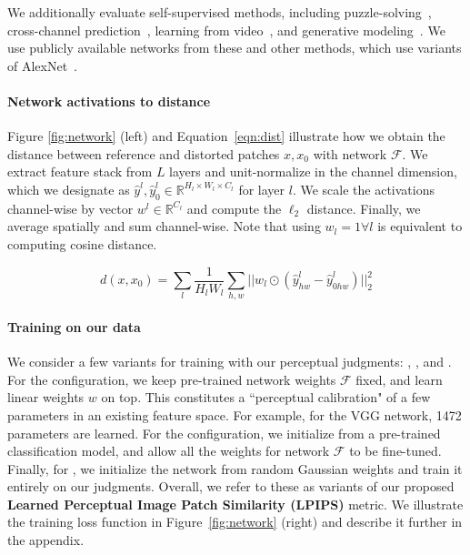 We additionally evaluate self-supervised methods, including puzzle-solving~\cite{noroozi2016unsupervised}, cross-channel prediction~\cite{zhang2016colorful,zhang2017split}, learning from video~\cite{pathak2017learning}, and generative modeling~\cite{donahue2016adversarial}. We use publicly available networks from these and other methods, which use variants of AlexNet~\cite{krizhevsky2012imagenet}.

\paragraph{Network activations to distance} Figure \ref{fig:network} (left) and Equation~\ref{eqn:dist} illustrate how we obtain the distance between reference and distorted patches ${x,x_0}$ with network $\mathcal{F}$. We extract feature stack from $L$ layers and unit-normalize in the channel dimension, which we designate as $\hat{y}^l, \hat{y}_0^l \in \mathds{R}^{H_l\times W_l\times C_l}$ for layer $l$. We scale the activations channel-wise by vector $w^l \in \mathds{R}^{C_l}$ and compute the $\ell_2$ distance. Finally, we average spatially and sum channel-wise. Note that using $w_l=1 \forall l$ is equivalent to computing cosine distance.

\vspace{-4mm}
\begin{equation}
d(x,x_0) = \sum_l \dfrac{1}{H_l W_l} \sum_{h,w} || w_l \odot ( \hat{y}_{hw}^l - \hat{y}_{0hw}^l ) ||_2^2
\label{eqn:dist}
\end{equation}

\vspace{-2mm}

\paragraph{Training on our data} We consider a few variants for training with our perceptual judgments: , , and . For the  configuration, we keep pre-trained network weights $\mathcal{F}$ fixed, and learn linear weights $w$ on top. This constitutes a ``perceptual calibration" of a few parameters in an existing feature space. 
For example, for the VGG network, 1472 parameters are learned. For the  configuration, we initialize from a pre-trained classification model, and allow all the weights for network $\mathcal{F}$ to be fine-tuned. Finally, for , we initialize the network from random Gaussian weights and train it entirely on our judgments. Overall, we refer to these as variants of our proposed \textbf{Learned Perceptual Image Patch Similarity (LPIPS)} metric. We illustrate the training loss function in Figure~\ref{fig:network} (right) and describe it further in the appendix.

